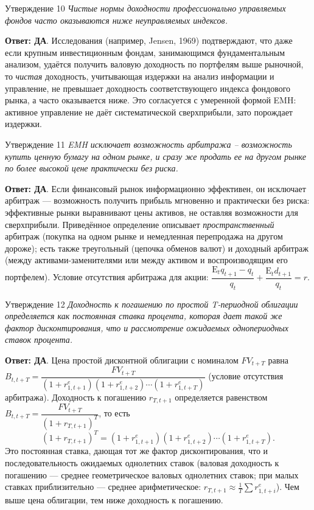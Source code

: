 \documentclass[10pt,a4paper]{article}
\newcommand{\qda}{\textbf{\color{yesgreen}Ответ: ДА}}
\newenvironment{answer}[2]{%
  \begin{qbox}{Утверждение #1}
  \textit{#2}\par\smallskip
}{%
  \end{qbox}\vspace{2pt}
}
\begin{document}
\begin{answer}{10}{Чистые нормы доходности профессионально управляемых фондов часто оказываются ниже неуправляемых индексов.}
\qda. Исследования (например, Jensen, 1969) подтверждают, что даже если крупным инвестиционным фондам, занимающимся фундаментальным анализом, удаётся получить валовую доходность по портфелям выше рыночной, то \emph{чистая} доходность, учитывающая издержки на анализ информации и управление, не превышает доходность соответствующего индекса фондового рынка, а часто оказывается ниже. Это согласуется с умеренной формой EMH: активное управление не даёт систематической сверхприбыли, зато порождает издержки.
\end{answer}

\begin{answer}{11}{EMH исключает возможность арбитража -- возможность купить ценную бумагу на одном рынке, и сразу же продать ее на другом рынке по более высокой цене практически без риска.}
\qda. Если финансовый рынок информационно эффективен, он исключает арбитраж --- возможность получить прибыль мгновенно и практически без риска: эффективные рынки выравнивают цены активов, не оставляя возможности для сверхприбыли. Приведённое определение описывает \emph{пространственный} арбитраж (покупка на одном рынке и немедленная перепродажа на другом дороже); есть также треугольный (цепочка обменов валют) и доходный арбитраж (между активами-заменителями или между активом и воспроизводящим его портфелем). Условие отсутствия арбитража для акции: $\dfrac{\mathrm{E}_tq_{t+1}-q_t}{q_t}+\dfrac{\mathrm{E}_td_{t+1}}{q_t}=r$.
\end{answer}

\begin{answer}{12}{Доходность к погашению по простой T-периодной облигации определяется как постоянная ставка процента, которая дает такой же фактор дисконтирования, что и рассмотрение ожидаемых однопериодных ставок процента.}
\qda. Цена простой дисконтной облигации с номиналом $FV_{t+T}$ равна $B_{t,t+T}=\dfrac{FV_{t+T}}{(1+r^e_{1,t+1})(1+r^e_{1,t+2})\cdots(1+r^e_{1,t+T})}$ (условие отсутствия арбитража). Доходность к погашению $r_{T,t+1}$ определяется равенством $B_{t,t+T}=\dfrac{FV_{t+T}}{(1+r_{T,t+1})^T}$, то есть
\[
(1+r_{T,t+1})^T=(1+r^e_{1,t+1})(1+r^e_{1,t+2})\cdots(1+r^e_{1,t+T}).
\]
Это постоянная ставка, дающая тот же фактор дисконтирования, что и последовательность ожидаемых однолетних ставок (валовая доходность к погашению --- среднее геометрическое валовых однолетних ставок; при малых ставках приблизительно --- среднее арифметическое: $r_{T,t+1}\approx\frac1T\sum r^e_{1,t+i}$). Чем выше цена облигации, тем ниже доходность к погашению.
\end{answer}
\end{document}
